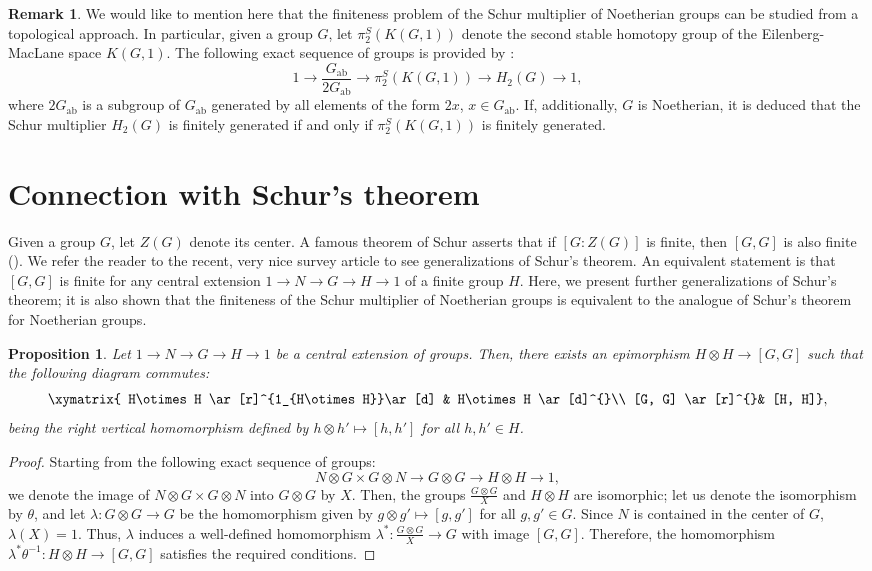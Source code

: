 \documentclass[12pt,reqno]{amsart}
\newtheorem{proposition}[subsection]{Proposition}
\theoremstyle{definition}
\newtheorem{remark}[subsection]{Remark}
\numberwithin{equation}{section}
\theoremstyle{definition}
\def\lam{\lambda}
\DeclareMathOperator{\ab}{ab}
\begin{document}
\begin{remark}
We would like to mention here that the finiteness problem of the Schur multiplier of Noetherian groups can be studied from a topological approach. In particular,
given a group $G$, let $\pi_2^S(K(G, 1))$ denote the second stable homotopy group of the Eilenberg-MacLane space
$K(G, 1)$. The following exact sequence of groups is provided by \cite[Theorem 4.7]{ADST}:
\[
1 \to \frac{G_{\ab}}{2G_{\ab}}\to \pi_2^S(K(G, 1)) \to H_2(G)\to 1,
\]
where $2G_{\ab}$ is a subgroup of $G_{\ab}$ generated by all elements
of the form $2x$, $x\in G_{\ab}$. If, additionally, $G$ is Noetherian, it is deduced that the Schur multiplier $H_2(G)$ is finitely generated
if and only if  $\pi_2^S(K(G, 1))$ is finitely generated.
\end{remark}




\section{Connection with Schur's theorem}\label{S:schur}

Given a group $G$, let $Z(G)$ denote its center. A famous theorem of Schur asserts that if $[G : Z(G)]$ is finite,
then $[G, G]$ is also finite (\!\cite{RoDe, RoJo}). We refer the reader to the recent, very nice survey article \cite{DKP} to see generalizations of Schur's theorem.
An equivalent statement is that $[G, G]$ is finite for any central extension  $1\to N \to G \to H \to 1$ of a finite group $H$.
Here, we present further generalizations of  Schur's theorem; it is also shown that the finiteness of the Schur multiplier of Noetherian groups is equivalent
to the analogue of Schur's theorem for Noetherian groups.

\begin{proposition} \label{prop}
Let $1\to N \to G \to H \to 1$ be a central extension of groups. Then, there exists an epimorphism $H\otimes H \to [G, G]$ such that
the following diagram commutes:
\[
\xymatrix{
H\otimes H \ar[r]^{1_{H\otimes H}}\ar[d] & H\otimes H \ar[d]^{}\\
[G, G] \ar[r]^{}& [H, H]} ,
\]
being the right vertical homomorphism  defined by $h\otimes h'\mapsto [h, h']$ for all $h, h'\in H$.
\end{proposition}
\begin{proof}
Starting from the following exact sequence of groups:
\[
N\otimes G \times G\otimes N \to G\otimes G \to H\otimes H \to 1,
\]
we denote the image of $N\otimes G \times G\otimes N$ into $G\otimes G$ by $X$. Then, the groups $\frac{G\otimes G} { X}$ and  $H\otimes H$ are isomorphic; let us denote the isomorphism by $\theta$, and
let $\lam \colon G\otimes G\to G$ be the homomorphism given by
$g\otimes g'\mapsto [g, g']$ for all $g, g'\in G$. Since $N$ is contained in the center of $G$, $\lam (X)=1$. Thus, $\lambda$ induces a well-defined homomorphism
$\lam^* \colon \frac{G\otimes G }{ X }\to G$ with image $[G, G]$.
Therefore, the homomorphism $\lam ^* \theta ^{-1} \colon  H\otimes H \to [G, G]$ satisfies the required conditions.
\end{proof}
\end{document}
